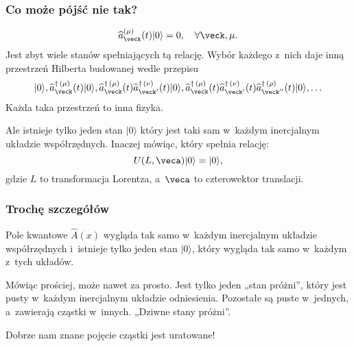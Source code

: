 \documentclass[10pt,t]{beamer}
\begin{document}
\begin{frame}
  \frametitle{Co może pójść nie tak?}


  \begin{equation}
    \label{eq:Niespodziewane-teoretyczne-08}
    \widehat{a}_{ \veck }^{ ( \mu ) }( t ) | 0 \rangle = 0, \quad
    \forall \veck, \mu.
  \end{equation}
  Jest zbyt wiele stanów spełniających tą relację. Wybór każdego
  z~nich daje inną przestrzeń Hilberta budowanej wedle przepisu
  \begin{equation}
    \label{eq:Niespodziewane-teoretyczne-09}
    | 0 \rangle,
    \widehat{a}^{ \dagger \, ( \mu ) }_{ \veck }( t ) | 0 \rangle,
    \widehat{a}^{ \dagger \, ( \mu ) }_{ \veck }( t )
    \widehat{a}^{ \dagger \, ( \nu ) }_{ \veck' }( t ) | 0 \rangle,
    \widehat{a}^{ \dagger \, ( \mu ) }_{ \veck }( t )
    \widehat{a}^{ \dagger \, ( \nu ) }_{ \veck' }( t )
    \widehat{a}^{ \dagger \, ( \rho ) }_{ \veck'' }( t ) | 0 \rangle, \ldots
  \end{equation}
  Każda taka przestrzeń to inna fizyka.

  Ale istnieje tylko \alert{jeden} stan $| 0 \rangle$ który jest taki
  sam w~każdym inercjalnym układzie współrzędnych. Inaczej mówiąc,
  który spełnia relację:
  \begin{equation}
    \label{eq:Niespodziewane-teoretyczne-10}
    U( L, \veca ) | 0 \rangle = | 0 \rangle,
  \end{equation}
  gdzie $L$ to transformacja Lorentza, a~$\veca$ to czterowektor
  translacji.

\end{frame}





\begin{frame}
  \frametitle{Trochę szczegółów}


  Pole kwantowe $\widehat{A}( x )$ wygląda tak samo w~każdym
  inercjalnym układzie współrzędnych i~istnieje tylko jeden stan
  $| 0 \rangle$, który wygląda tak samo w~każdym z~tych układów.

  Mówiąc prościej, może nawet za prosto. Jest tylko jeden „stan
  próżni”, który jest pusty w~\alert{każdym} inercjalnym układzie
  odniesienia. Pozostałe są puste w~jednych, a~zawierają cząstki
  w~innych. „Dziwne stany próżni”.

  Dobrze nam znane pojęcie cząstki jest uratowane!

\end{frame}
\end{document}

